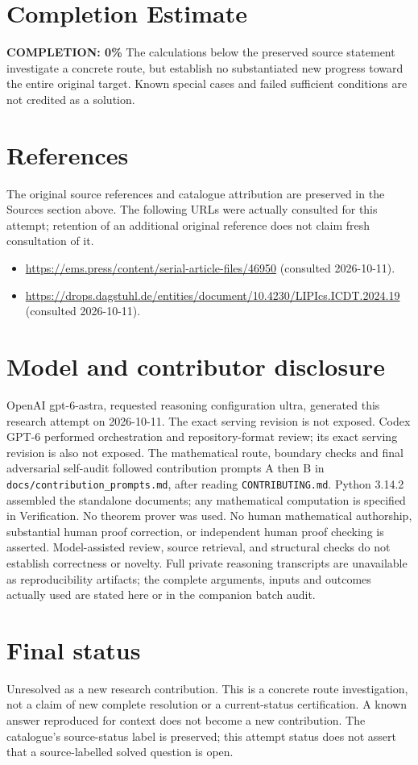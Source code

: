 \documentclass[11pt]{article}
\begin{document}
\section{Completion Estimate}
\noindent\textbf{COMPLETION: 0\%}
The calculations below the preserved source statement investigate a concrete route,
but establish no substantiated new progress toward the entire original target.
Known special cases and failed sufficient conditions are not credited as a solution.
\section{References}
The original source references and catalogue attribution are preserved in the
Sources section above. The following URLs were actually consulted for this attempt;
retention of an additional original reference does not claim fresh consultation of it.
\begin{itemize}
\item \url{https://ems.press/content/serial-article-files/46950} (consulted 2026-10-11). 
\item \url{https://drops.dagstuhl.de/entities/document/10.4230/LIPIcs.ICDT.2024.19} (consulted 2026-10-11). 
\end{itemize}
\section{Model and contributor disclosure}
OpenAI gpt-6-astra, requested reasoning configuration ultra, generated this research
attempt on 2026-10-11. The exact serving revision is not exposed. Codex GPT-6
performed orchestration and repository-format review; its exact serving revision
is also not exposed. The mathematical route, boundary checks and final adversarial
self-audit followed contribution prompts A then B in
\texttt{docs/contribution\_prompts.md}, after reading \texttt{CONTRIBUTING.md}.
Python 3.14.2 assembled the standalone documents; any mathematical computation is
specified in Verification. No theorem prover was used. No human mathematical
authorship, substantial human proof correction, or independent human proof checking
is asserted. Model-assisted review, source retrieval, and structural checks do not
establish correctness or novelty. Full private reasoning transcripts are unavailable
as reproducibility artifacts; the complete arguments, inputs and outcomes actually
used are stated here or in the companion batch audit.
\section{Final status}
Unresolved as a new research contribution. This is a concrete route investigation,
not a claim of new complete resolution or a current-status certification. A known
answer reproduced for context does not become a new contribution. The catalogue's
source-status label is preserved; this attempt status does not assert that a
source-labelled solved question is open.
\end{document}
